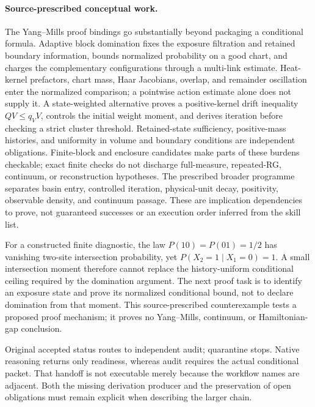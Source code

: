 \paragraph{Source-prescribed conceptual work.}
The Yang--Mills proof bindings go substantially beyond packaging a conditional formula. Adaptive block domination fixes the exposure filtration and retained boundary information, bounds normalized probability on a good chart, and charges the complementary configurations through a multi-link estimate. Heat-kernel prefactors, chart mass, Haar Jacobians, overlap, and remainder oscillation enter the normalized comparison; a pointwise action estimate alone does not supply it. A state-weighted alternative proves a positive-kernel drift inequality $QV\leq q_VV$, controls the initial weight moment, and derives iteration before checking a strict cluster threshold. Retained-state sufficiency, positive-mass histories, and uniformity in volume and boundary conditions are independent obligations. Finite-block and enclosure candidates make parts of these burdens checkable; exact finite checks do not discharge full-measure, repeated-RG, continuum, or reconstruction hypotheses. The prescribed broader programme separates basin entry, controlled iteration, physical-unit decay, positivity, observable density, and continuum passage. These are implication dependencies to prove, not guaranteed successes or an execution order inferred from the skill list.

For a constructed finite diagnostic, the law $P(10)=P(01)=1/2$ has vanishing two-site intersection probability, yet $P(X_2=1\mid X_1=0)=1$. A small intersection moment therefore cannot replace the history-uniform conditional ceiling required by the domination argument. The next proof task is to identify an exposure state and prove its normalized conditional bound, not to declare domination from that moment. This source-prescribed counterexample tests a proposed proof mechanism; it proves no Yang--Mills, continuum, or Hamiltonian-gap conclusion.

Original accepted status routes to independent audit; quarantine stops. Native reasoning returns only readiness, whereas audit requires the actual conditional packet. That handoff is not executable merely because the workflow names are adjacent. Both the missing derivation producer and the preservation of open obligations must remain explicit when describing the larger chain.



